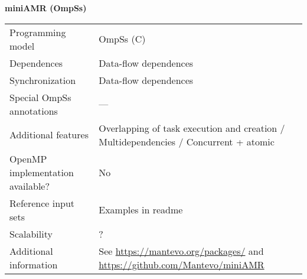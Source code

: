 \section*{}
\label{miniamr:ompss}
\centering
\Huge
\textbf{miniAMR (OmpSs)}

\begin{table}[h!]
  \large
  \centering
  \begin{tabular}{|l|l|}
    \hline
    Programming model                & OmpSs (C) \\
    Dependences                      & Data-flow dependences \\
    Synchronization                  & Data-flow dependences \\
    Special OmpSs annotations        & --- \\
    Additional features              & Overlapping of task execution and creation / Multidependencies / Concurrent + atomic \\
    OpenMP implementation available? & No \\
    Reference input sets             & Examples in readme \\
    Scalability                      & ? \\
    Additional information           & See \url{https://mantevo.org/packages/} and \url{https://github.com/Mantevo/miniAMR} \\
    \hline
  \end{tabular}
\end{table}

\newpage
